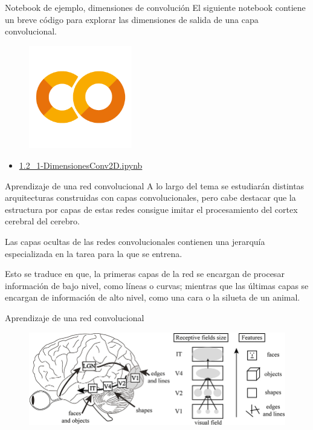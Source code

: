 \begin{frame}{Notebook de ejemplo, dimensiones de convolución}
El siguiente notebook contiene un breve código para explorar las \alert{dimensiones de salida} de una capa convolucional.

\begin{figure}
    \centering
    \includegraphics[width=0.4\textwidth]{Slides/figures/GoogleColab.png}
\end{figure}
\begin{itemize}
    \centering
    \item {\Large \href{https://colab.research.google.com/drive/1UpvEAbh6kwSScuOJjf7228ZA5lWCHihO?usp=sharing}{1.2\_1-DimensionesConv2D.ipynb}}
\end{itemize}
\end{frame}

\begin{frame}{Aprendizaje de una red convolucional}
A lo largo del tema se estudiarán distintas \alert{arquitecturas} construidas con capas convolucionales, pero cabe destacar que la \alert{estructura por capas} de estas redes consigue \alert{imitar} el procesamiento del \alert{cortex cerebral} del cerebro.

Las capas \alert{ocultas} de las redes convolucionales contienen una \alert{jerarquía} especializada en la tarea para la que se entrena.

Esto se traduce en que, la \alert{primeras} capas de la red se encargan de procesar información de \alert{bajo nivel}, como \alert{líneas} o \alert{curvas}; mientras que las \alert{últimas} capas se encargan de información de \alert{alto nivel}, como una cara o la silueta de un animal.
\end{frame}

\begin{frame}{Aprendizaje de una red convolucional}
\begin{figure}
    \centering
    \includegraphics[width=\textwidth]{Slides/figures/Tema 3/Cortex.jpg}
    \caption{\cite{Cortex}}
\end{figure}
\end{frame}

